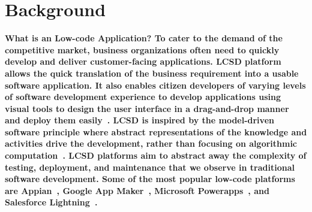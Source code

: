 \section{Background} \label{sec:background}
\nd\bf{What is an  Low-code Application?} To cater to the demand of the competitive market, business organizations often need to quickly develop and deliver customer-facing applications.  LCSD platform allows the quick translation of the business requirement into a usable software application. It also enables citizen developers of varying levels of software development experience to develop applications using visual tools to design the user interface in a drag-and-drop manner and deploy them easily~\cite{lowcodewiki}.  LCSD is inspired by the model-driven software principle where abstract representations of the knowledge and activities drive the development, rather than focusing on algorithmic computation~\cite{sahay2020supporting}.  LCSD platforms aim to abstract away the complexity of testing, deployment, and maintenance that we observe in traditional software development. Some of the most popular low-code platforms are Appian~\cite{appian}, Google App Maker~\cite{googleappmaker}, Microsoft Powerapps~\cite{powerapps}, and Salesforce Lightning~\cite{salesforce}. 


